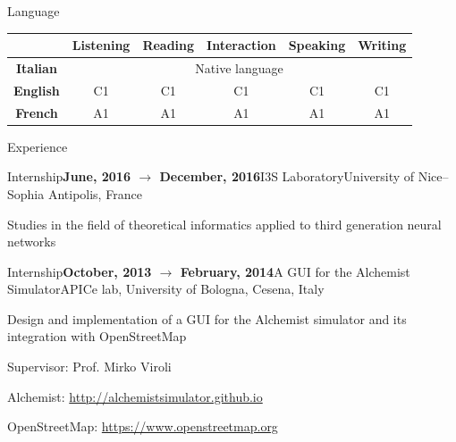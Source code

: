 \documentclass{resume} %
\begin{document}
\begin{rSection}{Language}
\begin{center}
\begin{tabular}{|c|c|c|c|c|c|}
	\hline
	&\textbf{Listening}&\textbf{Reading}&\textbf{Interaction}&\textbf{Speaking}&\textbf{Writing}\\\hline
	\textbf{Italian}&\multicolumn{5}{c}{Native language}\vline\\\hline
	\textbf{English}&C1&C1&C1&C1&C1\\\hline
	\textbf{French}&A1&A1&A1&A1&A1 \\
	\hline
\end{tabular}
\end{center}
\end{rSection}



\begin{rSection}{Experience}

\begin{rSubsection}{Internship}{\textbf{June, 2016 $\rightarrow$ December, 2016}}{I3S Laboratory}{University of Nice--Sophia Antipolis, France}
	\item Studies in the field of theoretical informatics applied to third generation neural networks
\end{rSubsection}

\begin{rSubsection}{Internship}{\textbf{October, 2013 $\rightarrow$ February, 2014}}{A GUI for the Alchemist Simulator}{APICe lab, University of Bologna, Cesena, Italy}
\item Design and implementation of a GUI for the Alchemist simulator and its integration with OpenStreetMap
\item Supervisor: Prof. Mirko Viroli
\item Alchemist: \url{http://alchemistsimulator.github.io}
\item OpenStreetMap: \url{https://www.openstreetmap.org}
\end{rSubsection}

\end{rSection}
\end{document}
